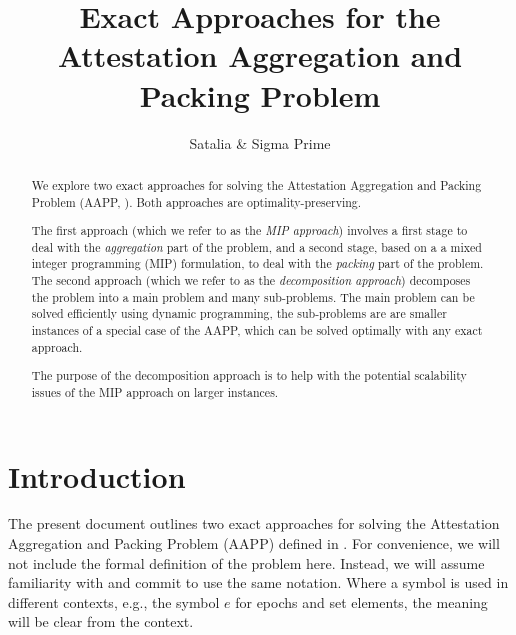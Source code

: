 \documentclass{article}
\title{Exact Approaches for the\\Attestation Aggregation and Packing Problem}
\author{Satalia \& Sigma Prime}
\begin{document}
\maketitle{}

\begin{abstract}
We explore two exact approaches for solving the Attestation Aggregation and
Packing Problem (AAPP, \cite{Satalia22a}). Both approaches are
optimality-preserving.

The first approach (which we refer to as the \emph{MIP approach}) involves a
first stage to deal with the \emph{aggregation} part of the problem, and a
second stage, based on a a mixed integer programming (MIP) formulation, to deal
with the \emph{packing} part of the problem. The second approach (which we
refer to as the \emph{decomposition approach}) decomposes the problem into a
main problem and many sub-problems. The main problem can be solved efficiently
using dynamic programming, the sub-problems are are smaller instances of a
special case of the AAPP, which can be solved optimally with any exact
approach.

The purpose of the decomposition approach is to help with the potential
scalability issues of the MIP approach on larger instances.
\end{abstract}

\tableofcontents

\newpage

\section{Introduction}

\newcommand{\attestations}{\ensuremath{A}}
\newcommand{\solution}{\ensuremath{S}}
\newcommand{\attester}{\ensuremath{v}}
\newcommand{\attesters}[1]{\ensuremath{V_{#1}}}
\newcommand{\allattesters}{\ensuremath{V}}
\newcommand{\epoch}[1]{\ensuremath{e(#1)}}
\newcommand{\attestation}{\ensuremath{a}}
\newcommand{\data}[1]{\ensuremath{d_{#1}}}
\newcommand{\Data}{\ensuremath{D}}
\newcommand{\epochs}{\ensuremath{E}}
\newcommand{\Reward}[1]{\ensuremath{R\left(#1\right)}}
\newcommand{\reward}[2]{\ensuremath{r\left(#1, #2\right)}}

The present document outlines two exact approaches for solving the Attestation
Aggregation and Packing Problem (AAPP) defined in \cite{Satalia22a}. For
convenience, we will not include the formal definition of the problem here.
Instead, we will assume familiarity with \cite{Satalia22a} and commit to use
the same notation. Where a symbol is used in different contexts, e.g., the
symbol $e$ for epochs and set elements, the meaning will be clear from the
context.
\end{document}
